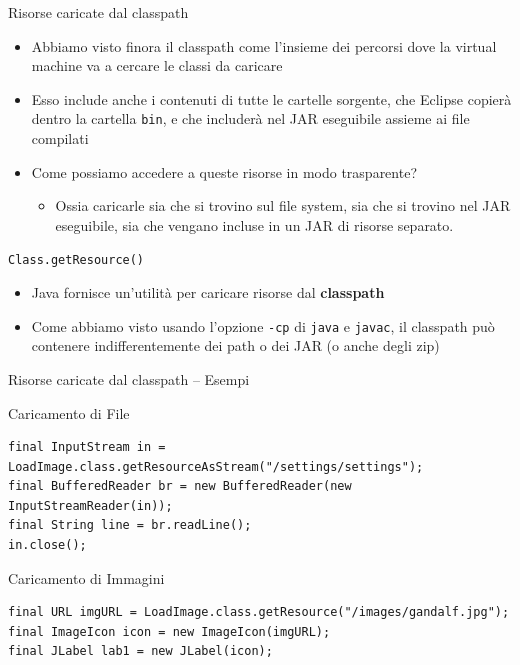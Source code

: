\documentclass[presentation]{beamer}
\begin{document}
\begin{frame}{Risorse caricate dal classpath}
	\begin{itemize}
		\item Abbiamo visto finora il classpath come l'insieme dei percorsi dove la virtual machine va a cercare le classi da caricare
		\item Esso include anche i contenuti di tutte le cartelle sorgente, che Eclipse copierà dentro la cartella \texttt{bin}, e che includerà nel JAR eseguibile assieme ai file compilati
		\item Come possiamo accedere a queste risorse in modo trasparente?
		\begin{itemize}
			\item Ossia caricarle sia che si trovino sul file system, sia che si trovino nel JAR eseguibile, sia che vengano incluse in un JAR di risorse separato.
		\end{itemize} 
	\end{itemize}
	\begin{block}{\texttt{Class.getResource()}}
		\begin{itemize}
			\item Java fornisce un'utilità per caricare risorse dal \textbf{classpath}
			\item Come abbiamo visto usando l'opzione \texttt{-cp} di \texttt{java} e \texttt{javac}, il classpath può contenere indifferentemente dei path o dei JAR (o anche degli zip)
		\end{itemize}
		\end{block}
\end{frame}

\begin{frame}[fragile]{Risorse caricate dal classpath -- Esempi}

\begin{block}{Caricamento di File}
\begin{lstlisting}
final InputStream in = LoadImage.class.getResourceAsStream("/settings/settings");
final BufferedReader br = new BufferedReader(new InputStreamReader(in));
final String line = br.readLine();
in.close();
\end{lstlisting}
\end{block}

\begin{block}{Caricamento di Immagini}
\begin{lstlisting}
final URL imgURL = LoadImage.class.getResource("/images/gandalf.jpg");
final ImageIcon icon = new ImageIcon(imgURL);
final JLabel lab1 = new JLabel(icon);
\end{lstlisting}
\end{block}
\end{frame}
\end{document}
